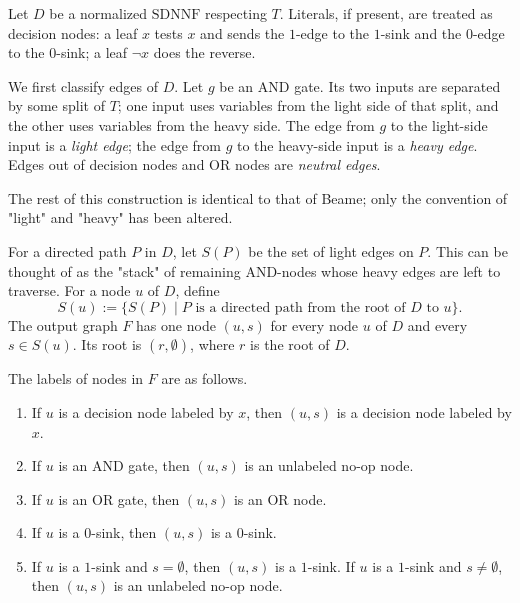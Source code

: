 \documentclass[11pt]{article}
\theoremstyle{plain}
\theoremstyle{definition}
\theoremstyle{remark}
\newcommand{\SDNNF}{\mathrm{SDNNF}}
\begin{document}
Let $D$ be a normalized $\SDNNF$ respecting $T$.  Literals, if present, are
treated as decision nodes: a leaf $x$ tests $x$ and sends the $1$-edge to the
$1$-sink and the $0$-edge to the $0$-sink; a leaf $\neg x$ does the reverse.

We first classify edges of $D$.  Let $g$ be an AND gate.  Its two inputs are
separated by some split of $T$; one input uses variables from the light side of
that split, and the other uses variables from the heavy side.  The edge from
$g$ to the light-side input is a \emph{light edge}; the edge from $g$ to the
heavy-side input is a \emph{heavy edge}.  Edges out of decision nodes and OR
nodes are \emph{neutral edges}.

The rest of this construction is identical to that of Beame; only the convention
of "light" and "heavy" has been altered.

For a directed path $P$ in $D$, let $S(P)$ be the set of light edges on $P$.
This can be thought of as the "stack" of remaining AND-nodes whose heavy edges 
are left to traverse.
For a node $u$ of $D$, define
\[
  S(u) := \{S(P) \mid P \text{ is a directed path from the root of } D
          \text{ to } u\}.
\]
The output graph $F$ has one node $(u,s)$ for every node $u$ of $D$ and every
$s\in S(u)$.  Its root is $(r,\emptyset)$, where $r$ is the root of $D$.

The labels of nodes in $F$ are as follows.
\begin{enumerate}[label=(\roman*),noitemsep]
  \item If $u$ is a decision node labeled by $x$, then $(u,s)$ is a decision
  node labeled by $x$.
  \item If $u$ is an AND gate, then $(u,s)$ is an unlabeled no-op node.
  \item If $u$ is an OR gate, then $(u,s)$ is an OR node.
  \item If $u$ is a $0$-sink, then $(u,s)$ is a $0$-sink.
  \item If $u$ is a $1$-sink and $s=\emptyset$, then $(u,s)$ is a $1$-sink.
  If $u$ is a $1$-sink and $s\neq\emptyset$, then $(u,s)$ is an unlabeled
  no-op node.
\end{enumerate}
\end{document}
